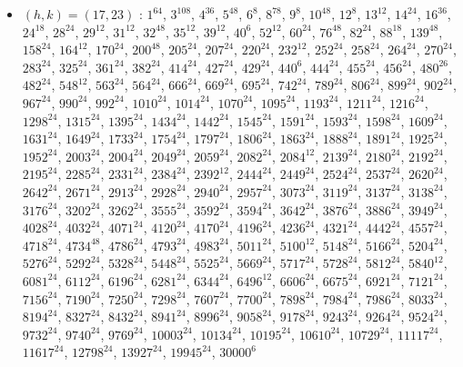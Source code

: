 \begin{itemize}
\item $(h,k)=(17,23)$ : $1^{64}$, $3^{108}$, $4^{36}$, $5^{48}$, $6^{8}$, $8^{78}$, $9^{8}$, $10^{48}$, $12^{8}$, $13^{12}$, $14^{24}$, $16^{36}$, $24^{18}$, $28^{24}$, $29^{12}$, $31^{12}$, $32^{48}$, $35^{12}$, $39^{12}$, $40^{6}$, $52^{12}$, $60^{24}$, $76^{48}$, $82^{24}$, $88^{18}$, $139^{48}$, $158^{24}$, $164^{12}$, $170^{24}$, $200^{48}$, $205^{24}$, $207^{24}$, $220^{24}$, $232^{12}$, $252^{24}$, $258^{24}$, $264^{24}$, $270^{24}$, $283^{24}$, $325^{24}$, $361^{24}$, $382^{24}$, $414^{24}$, $427^{24}$, $429^{24}$, $440^{6}$, $444^{24}$, $455^{24}$, $456^{24}$, $480^{26}$, $482^{24}$, $548^{12}$, $563^{24}$, $564^{24}$, $666^{24}$, $669^{24}$, $695^{24}$, $742^{24}$, $789^{24}$, $806^{24}$, $899^{24}$, $902^{24}$, $967^{24}$, $990^{24}$, $992^{24}$, $1010^{24}$, $1014^{24}$, $1070^{24}$, $1095^{24}$, $1193^{24}$, $1211^{24}$, $1216^{24}$, $1298^{24}$, $1315^{24}$, $1395^{24}$, $1434^{24}$, $1442^{24}$, $1545^{24}$, $1591^{24}$, $1593^{24}$, $1598^{24}$, $1609^{24}$, $1631^{24}$, $1649^{24}$, $1733^{24}$, $1754^{24}$, $1797^{24}$, $1806^{24}$, $1863^{24}$, $1888^{24}$, $1891^{24}$, $1925^{24}$, $1952^{24}$, $2003^{24}$, $2004^{24}$, $2049^{24}$, $2059^{24}$, $2082^{24}$, $2084^{12}$, $2139^{24}$, $2180^{24}$, $2192^{24}$, $2195^{24}$, $2285^{24}$, $2331^{24}$, $2384^{24}$, $2392^{12}$, $2444^{24}$, $2449^{24}$, $2524^{24}$, $2537^{24}$, $2620^{24}$, $2642^{24}$, $2671^{24}$, $2913^{24}$, $2928^{24}$, $2940^{24}$, $2957^{24}$, $3073^{24}$, $3119^{24}$, $3137^{24}$, $3138^{24}$, $3176^{24}$, $3202^{24}$, $3262^{24}$, $3555^{24}$, $3592^{24}$, $3594^{24}$, $3642^{24}$, $3876^{24}$, $3886^{24}$, $3949^{24}$, $4028^{24}$, $4032^{24}$, $4071^{24}$, $4120^{24}$, $4170^{24}$, $4196^{24}$, $4236^{24}$, $4321^{24}$, $4442^{24}$, $4557^{24}$, $4718^{24}$, $4734^{48}$, $4786^{24}$, $4793^{24}$, $4983^{24}$, $5011^{24}$, $5100^{12}$, $5148^{24}$, $5166^{24}$, $5204^{24}$, $5276^{24}$, $5292^{24}$, $5328^{24}$, $5448^{24}$, $5525^{24}$, $5669^{24}$, $5717^{24}$, $5728^{24}$, $5812^{24}$, $5840^{12}$, $6081^{24}$, $6112^{24}$, $6196^{24}$, $6281^{24}$, $6344^{24}$, $6496^{12}$, $6606^{24}$, $6675^{24}$, $6921^{24}$, $7121^{24}$, $7156^{24}$, $7190^{24}$, $7250^{24}$, $7298^{24}$, $7607^{24}$, $7700^{24}$, $7898^{24}$, $7984^{24}$, $7986^{24}$, $8033^{24}$, $8194^{24}$, $8327^{24}$, $8432^{24}$, $8941^{24}$, $8996^{24}$, $9058^{24}$, $9178^{24}$, $9243^{24}$, $9264^{24}$, $9524^{24}$, $9732^{24}$, $9740^{24}$, $9769^{24}$, $10003^{24}$, $10134^{24}$, $10195^{24}$, $10610^{24}$, $10729^{24}$, $11117^{24}$, $11617^{24}$, $12798^{24}$, $13927^{24}$, $19945^{24}$, $30000^{6}$

\end{itemize}
